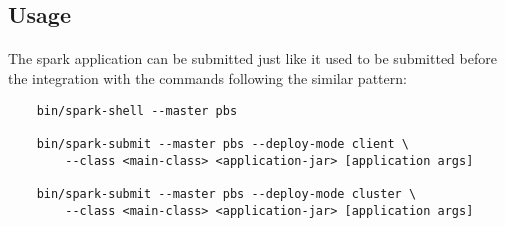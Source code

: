 \subsection{Usage}
\paragraph{}
The \gls{spark} application can be submitted just like it used to be submitted
before the  integration with the commands following the similar
pattern:
\begin{lstlisting}
    bin/spark-shell --master pbs

    bin/spark-submit --master pbs --deploy-mode client \
        --class <main-class> <application-jar> [application args]

    bin/spark-submit --master pbs --deploy-mode cluster \
        --class <main-class> <application-jar> [application args]
\end{lstlisting}
